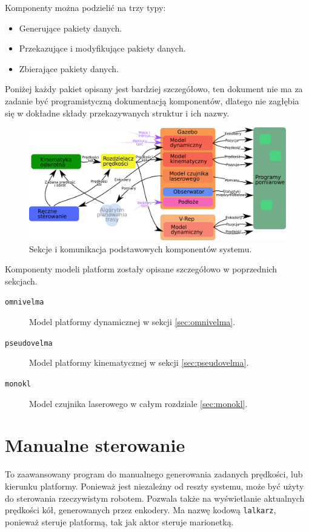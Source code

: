 Komponenty można podzielić na trzy typy:
\begin{itemize}
	\item Generujące pakiety danych.
	\item Przekazujące i modyfikujące pakiety danych.
	\item Zbierające pakiety danych.
\end{itemize}
Poniżej każdy pakiet opisany jest bardziej szczegółowo, ten dokument nie ma za zadanie być programistyczną dokumentacją komponentów, dlatego 
nie zagłębia się w dokładne składy przekazywanych struktur i ich nazwy.

\begin{figure}[H]
	\centering
	\includegraphics[width=\textwidth]{graphics/comm.pdf}
	\caption{Sekcje i komunikacja podstawowych komponentów systemu.}
\end{figure} 

Komponenty modeli platform zostały opisane szczegółowo w poprzednich sekcjach.

\begin{description}
	\item[\texttt{omnivelma}] Model platformy dynamicznej w sekcji \ref{sec:omnivelma}.
	\item[\texttt{pseudovelma}] Model platformy kinematycznej w sekcji \ref{sec:pseudovelma}.
	\item[\texttt{monokl}] Model czujnika laserowego w całym rozdziale \ref{sec:monokl}.
\end{description}

\section{Manualne sterowanie}
\label{sec:lalkarz}
	To zaawansowany program do manualnego generowania zadanych prędkości, lub kierunku platformy.
	Ponieważ jest niezależny od reszty systemu, może być użyty do sterowania rzeczywistym robotem.
	Pozwala także na wyświetlanie aktualnych prędkości kół, generowanych przez enkodery.
	Ma nazwę kodową \texttt{lalkarz}, ponieważ steruje platformą, tak jak aktor steruje marionetką.
	
